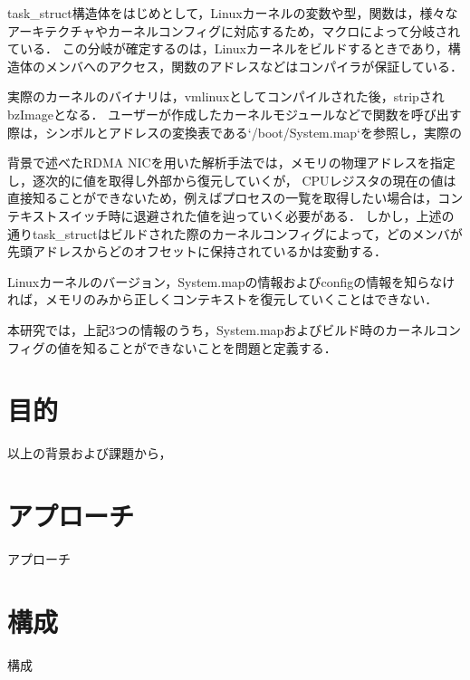 task_struct構造体をはじめとして，Linuxカーネルの変数や型，関数は，様々なアーキテクチャやカーネルコンフィグに対応するため，マクロによって分岐されている．
この分岐が確定するのは，Linuxカーネルをビルドするときであり，構造体のメンバへのアクセス，関数のアドレスなどはコンパイラが保証している．

実際のカーネルのバイナリは，vmlinuxとしてコンパイルされた後，stripされbzImageとなる．
ユーザーが作成したカーネルモジュールなどで関数を呼び出す際は，シンボルとアドレスの変換表である`/boot/System.map`を参照し，実際の

背景で述べたRDMA NICを用いた解析手法では，メモリの物理アドレスを指定し，逐次的に値を取得し外部から復元していくが，
CPUレジスタの現在の値は直接知ることができないため，例えばプロセスの一覧を取得したい場合は，コンテキストスイッチ時に退避された値を辿っていく必要がある．
しかし，上述の通りtask_structはビルドされた際のカーネルコンフィグによって，どのメンバが先頭アドレスからどのオフセットに保持されているかは変動する．

Linuxカーネルのバージョン，System.mapの情報およびconfigの情報を知らなければ，メモリのみから正しくコンテキストを復元していくことはできない．

本研究では，上記3つの情報のうち，System.mapおよびビルド時のカーネルコンフィグの値を知ることができないことを問題と定義する．

\section{目的}

以上の背景および課題から，

\section{アプローチ}

アプローチ

\section{構成}

構成
